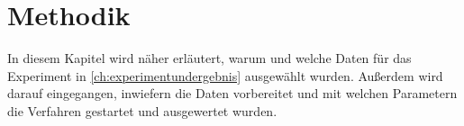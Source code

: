 \chapter{Methodik}\label{ch:methodik}
In diesem Kapitel wird näher erläutert, warum und welche Daten für das Experiment in \autoref{ch:experimentundergebnis} ausgewählt wurden. Außerdem wird darauf eingegangen, inwiefern die Daten vorbereitet und mit welchen Parametern die Verfahren gestartet und ausgewertet wurden.




